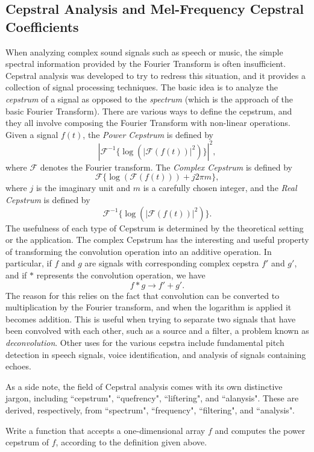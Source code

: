 \subsection*{Cepstral Analysis and Mel-Frequency Cepstral Coefficients}
When analyzing complex sound signals such as speech or music, the simple spectral information provided by
the Fourier Transform is often insufficient. Cepstral analysis was developed to try to redress this 
situation, and it provides a collection of signal processing techniques. The basic idea is to analyze the
\emph{cepstrum} of a signal as opposed to the \emph{spectrum} (which is the approach of the basic Fourier 
Transform). There are various ways to define the cepstrum, and they all involve composing the Fourier
Transform with non-linear operations. Given a signal $f(t)$, the \emph{Power Cepstrum} is defined by
$$
\left|\mathcal{F}^{-1}\{\log(|\mathcal{F}(f(t))|^2)\}\right|^2,
$$
where $\mathcal{F}$ denotes the Fourier transform. The \emph{Complex Cepstrum} is defined by
$$
\mathcal{F}\{\log(\mathcal{F}(f(t)))+j2\pi m\},
$$
where $j$ is the imaginary unit and $m$ is a carefully chosen integer, and the \emph{Real Cepstrum}
is defined by
$$
\mathcal{F}^{-1}\{\log(|\mathcal{F}(f(t))|^2)\}.
$$
The usefulness of each type of Cepstrum is determined by the theoretical setting or the application.
The complex Cepstrum has the interesting and useful property of transforming the convolution operation
into an additive operation. In particular, if $f$ and $g$ are signals with corresponding complex
cepstra $f'$ and $g'$, and if $*$ represents the convolution operation, we have
$$
f * g \rightarrow f' + g'.
$$
The reason for this relies on the fact that convolution can be converted to multiplication by
the Fourier transform, and when the logarithm is applied it becomes addition.
This is useful when trying to separate two signals that have been convolved with each other, such as
a source and a filter, a problem known as \emph{deconvolution}. 
Other uses for the various cepstra include fundamental pitch detection in speech signals, voice 
identification, and analysis of signals containing echoes.

As a side note, the field of Cepstral analysis comes with its own distinctive jargon, including ``cepstrum",
``quefrency", ``liftering", and ``alanysis". These are derived, respectively, from ``spectrum", 
``frequency", ``filtering", and ``analysis".


\begin{problem}
Write a function  that accepts a one-dimensional array $f$ and computes the
power cepstrum of $f$, according to the definition given above.
\end{problem}

